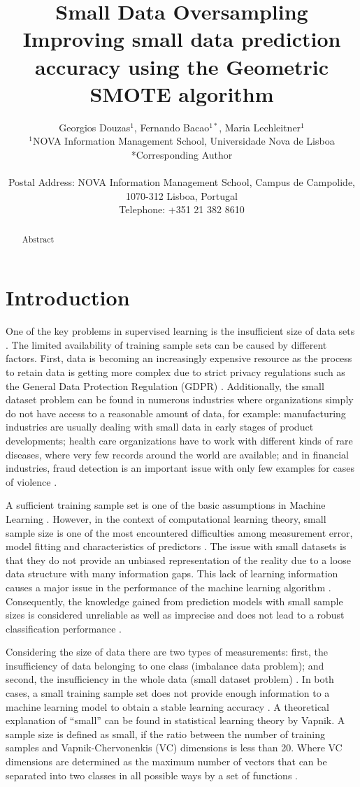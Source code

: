 \documentclass[parskip=full]{scrartcl}
\title{Small Data Oversampling  \\ \LARGE{Improving small data prediction accuracy using the Geometric SMOTE algorithm}}
\author{
	Georgios Douzas\(^{1}\), Fernando Bacao\(^{1*}\), Maria Lechleitner\(^{1}\) 
	\\
	\small{\(^{1}\)NOVA Information Management School, Universidade Nova de Lisboa}
	\\
	\small{*Corresponding Author}
	\\
	\\
	\small{Postal Address: NOVA Information Management School, Campus de Campolide, 1070-312 Lisboa, Portugal}
	\\
	\small{Telephone: +351 21 382 8610}
}
\date{}
\begin{document}
\maketitle

\begin{abstract}
Abstract
\end{abstract}

\section{Introduction}
One of the key problems in supervised learning is the insufficient size of data
sets \cite{Niyogi.1998}. The limited availability of training sample sets can be
caused by different factors. First, data is becoming an increasingly expensive resource
\cite{Li.2007} as the process to retain data is getting more complex due to
strict privacy regulations such as the General Data Protection Regulation (GDPR)
\cite{EuropeanCommission.2019}. Additionally, the small dataset problem can be
found in numerous industries where organizations simply do not have access to a
reasonable amount of data, for example: manufacturing industries are usually dealing with small data in early stages of product developments; health care organizations have to work with different kinds of rare diseases, where very few records around the world are available; and in financial industries, fraud detection is an important issue with only few examples for cases of violence
\cite{AbdulLateh.2017}.

A sufficient training sample set is one of the basic assumptions in Machine
Learning \cite{Ivanescu.2006}. However, in the context of computational learning
theory, small sample size is one of the most encountered difficulties among
measurement error, model fitting and characteristics of predictors
\cite{AbdulLateh.2017}. The issue with small datasets is that they do not provide an unbiased representation
of the reality due to a loose data structure with many information gaps. This
lack of learning information causes a major issue in the performance of the
machine learning algorithm \cite{Lin.2018}. Consequently, the knowledge gained
from prediction models with small sample sizes is considered unreliable as well
as imprecise and does not lead to a robust classification performance
\cite{AbdulLateh.2017}.

Considering the size of data there are two types of measurements: first, the insufficiency of data
belonging to one class (imbalance data problem); and second, the insufficiency
in the whole data (small dataset problem) \cite{Sezer.2014}. In both cases, a
small training sample set does not provide enough information to a machine
learning model to obtain a stable learning accuracy \cite{Tsai.2008}. A
theoretical explanation of “small” can be found in statistical learning theory
by Vapnik. A sample size is defined as small, if the ratio between the number of
training samples and Vapnik-Chervonenkis (VC) dimensions is less than 20. Where VC dimensions are determined as the maximum number of vectors that can be separated into two
classes in all possible ways by a set of functions \cite{Vapnik.2008}. 
\end{document}
